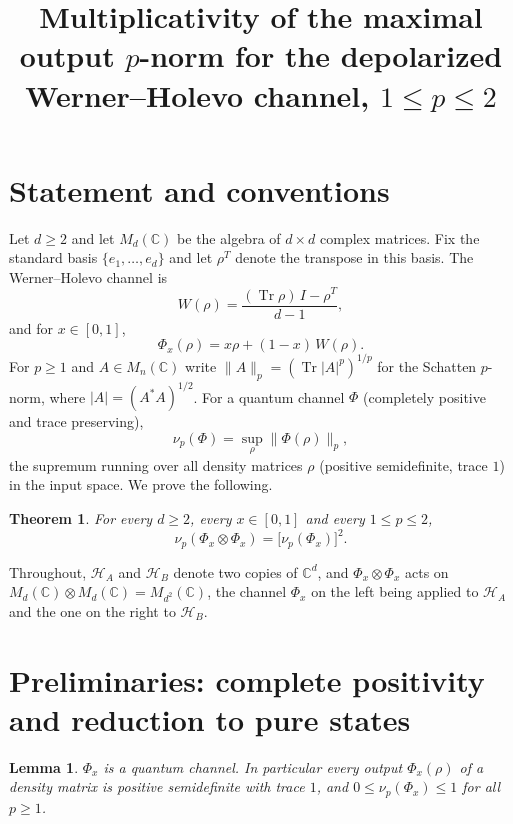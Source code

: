 \documentclass{amsart}
\newtheorem{theorem}{Theorem}
\newtheorem{lemma}{Lemma}
\theoremstyle{definition}
\DeclareMathOperator{\Tr}{Tr}
\newcommand{\HH}{\mathcal{H}}
\begin{document}
\title{Multiplicativity of the maximal output $p$-norm for the depolarized
Werner--Holevo channel, $1\le p\le 2$}
\maketitle

\section{Statement and conventions}

Let $d\ge 2$ and let $M_d(\mathbb{C})$ be the algebra of $d\times d$ complex
matrices. Fix the standard basis $\{e_1,\dots,e_d\}$ and let $\rho^{T}$ denote
the transpose in this basis. The Werner--Holevo channel is
\[
W(\rho)=\frac{(\Tr\rho)\,I-\rho^{T}}{d-1},
\]
and for $x\in[0,1]$,
\[
\Phi_x(\rho)=x\rho+(1-x)\,W(\rho).
\]
For $p\ge 1$ and $A\in M_n(\mathbb C)$ write $\|A\|_p=(\Tr|A|^p)^{1/p}$ for the
Schatten $p$-norm, where $|A|=(A^{*}A)^{1/2}$. For a quantum channel $\Phi$
(completely positive and trace preserving),
\[
\nu_p(\Phi)=\sup_{\rho}\|\Phi(\rho)\|_p ,
\]
the supremum running over all density matrices $\rho$ (positive semidefinite,
trace $1$) in the input space. We prove the following.

\begin{theorem}\label{thm:main}
For every $d\ge 2$, every $x\in[0,1]$ and every $1\le p\le 2$,
\[
\nu_p(\Phi_x\otimes\Phi_x)=\bigl[\nu_p(\Phi_x)\bigr]^{2}.
\]
\end{theorem}

Throughout, $\HH_A$ and $\HH_B$ denote two copies of $\mathbb C^{d}$, and
$\Phi_x\otimes\Phi_x$ acts on $M_d(\mathbb C)\otimes M_d(\mathbb C)=
M_{d^2}(\mathbb C)$, the channel $\Phi_x$ on the left being applied to
$\HH_A$ and the one on the right to $\HH_B$.

\section{Preliminaries: complete positivity and reduction to pure states}

\begin{lemma}\label{lem:cptp}
$\Phi_x$ is a quantum channel. In particular every output $\Phi_x(\rho)$ of a
density matrix is positive semidefinite with trace $1$, and
$0\le\nu_p(\Phi_x)\le 1$ for all $p\ge1$.
\end{lemma}
\end{document}
